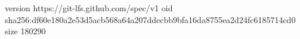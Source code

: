 version https://git-lfs.github.com/spec/v1
oid sha256:df60e180a2e53d5acb568a64a207ddecbb9bfa16da8755ea2d24fc6185714cd0
size 180290
